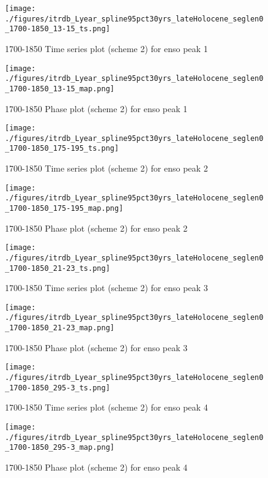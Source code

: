 \documentclass[smallextended]{svjour3}       %
\begin{document}
\clearpage
\newpage

\begin{figure}[!tbp]
\centering
\begin{minipage}[b]{0.45\textwidth}
\texttt{[image: ./figures/itrdb\_Lyear\_spline95pct30yrs\_lateHolocene\_seglen0\_1700-1850\_13-15\_ts.png]}
\caption{1700-1850 Time series plot (scheme 2) for enso peak 1}
\label{ts_1}
\end{minipage}
\hfill
\begin{minipage}[b]{0.45\textwidth}
\texttt{[image: ./figures/itrdb\_Lyear\_spline95pct30yrs\_lateHolocene\_seglen0\_1700-1850\_13-15\_map.png]}
\caption{1700-1850 Phase plot (scheme 2) for enso peak 1}
\label{map_1}
\end{minipage}
\end{figure}

\begin{figure}[!tbp]
\centering
\begin{minipage}[b]{0.45\textwidth}
\texttt{[image: ./figures/itrdb\_Lyear\_spline95pct30yrs\_lateHolocene\_seglen0\_1700-1850\_175-195\_ts.png]}
\caption{1700-1850 Time series plot (scheme 2) for enso peak 2}
\label{ts_2}
\end{minipage}
\hfill
\begin{minipage}[b]{0.45\textwidth}
\texttt{[image: ./figures/itrdb\_Lyear\_spline95pct30yrs\_lateHolocene\_seglen0\_1700-1850\_175-195\_map.png]}
\caption{1700-1850 Phase plot (scheme 2) for enso peak 2}
\label{map_2}
\end{minipage}
\end{figure}

\begin{figure}[!tbp]
\centering
\begin{minipage}[b]{0.45\textwidth}
\texttt{[image: ./figures/itrdb\_Lyear\_spline95pct30yrs\_lateHolocene\_seglen0\_1700-1850\_21-23\_ts.png]}
\caption{1700-1850 Time series plot (scheme 2) for enso peak 3}
\label{ts_3}
\end{minipage}
\hfill
\begin{minipage}[b]{0.45\textwidth}
\texttt{[image: ./figures/itrdb\_Lyear\_spline95pct30yrs\_lateHolocene\_seglen0\_1700-1850\_21-23\_map.png]}
\caption{1700-1850 Phase plot (scheme 2) for enso peak 3}
\label{map_3}
\end{minipage}
\end{figure}

\begin{figure}[!tbp]
\centering
\begin{minipage}[b]{0.45\textwidth}
\texttt{[image: ./figures/itrdb\_Lyear\_spline95pct30yrs\_lateHolocene\_seglen0\_1700-1850\_295-3\_ts.png]}
\caption{1700-1850 Time series plot (scheme 2) for enso peak 4}
\label{ts_4}
\end{minipage}
\hfill
\begin{minipage}[b]{0.45\textwidth}
\texttt{[image: ./figures/itrdb\_Lyear\_spline95pct30yrs\_lateHolocene\_seglen0\_1700-1850\_295-3\_map.png]}
\caption{1700-1850 Phase plot (scheme 2) for enso peak 4}
\label{map_4}
\end{minipage}
\end{figure}
\end{document}
